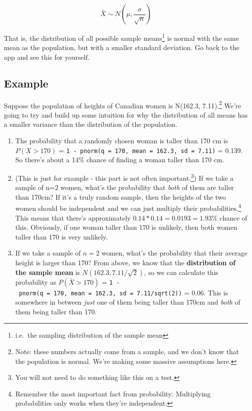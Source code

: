 \documentclass[
  letterpaper,
  DIV=11,
  numbers=noendperiod,
  oneside]{scrreprt}
\providecommand{\tightlist}{%
  \setlength{\itemsep}{0pt}\setlength{\parskip}{0pt}}\usepackage{longtable,booktabs,array}
\begin{document}
\[
\bar X \sim N\left(\mu, \frac{\sigma}{\sqrt{n}}\right)
\]

That is, the distribution of all possible sample means\footnote{i.e.~the
  sampling distribution of the sample mean} is normal with the same mean
as the population, but with a smaller standard deviation. Go back to the
app and see this for yourself.

\hypertarget{example-1}{%
\subsection{Example}\label{example-1}}

Suppose the population of heights of Canadian women is N(162.3,
7.11).\footnote{Note: these numbers actually come from a sample, and we
  don't know that the population is normal. We're making some massive
  assumptions here.} We're going to try and build up some intuition for
why the distribution of all means has a smaller variance than the
distribution of the population.

\begin{enumerate}
\def\labelenumi{\arabic{enumi}.}
\tightlist
\item
  The probability that a randomly chosen woman is taller than 170 cm is
  \(P(X > 170)\) =
  \texttt{1\ -\ pnorm(q\ =\ 170,\ mean\ =\ 162.3,\ sd\ =\ 7.11)} =
  0.139. So there's about a 14\% chance of finding a woman taller than
  170 cm.
\item
  (This is just for example - this part is not often
  important.\footnote{You will not need to do something like this on a
    test.}) If we take a sample of n=2 women, what's the probability
  that \emph{both} of them are taller than 170cm? If it's a truly random
  sample, then the heights of the two women should be independent and we
  can just multiply their probabilities.\footnote{Remember the most
    important fact from probability: Multiplying probabilities only
    works when they're independent.} This means that there's
  approximately \(0.14*0.14 = 0.0193 = 1.93\%\) chance of this.
  Obviously, if one woman taller than 170 is unlikely, then both women
  taller than 170 is very unlikely.
\item
  If we take a sample of \(n=2\) women, what's the probability that
  their average height is larger than 170? From above, we know that the
  \textbf{distribution of the sample mean} is
  \(N(162.3, 7.11/\sqrt{2})\), so we can calculate this probability as
  \(P(\bar X > 170)\) =
  \texttt{1\ -\ pnorm(q\ =\ 170,\ mean\ =\ 162.3,\ sd\ =\ 7.11/sqrt(2))}
  = 0.06. This is somewhere in between \emph{just} one of them being
  taller than 170cm and \emph{both} of them being taller than 170.
\end{enumerate}
\end{document}
